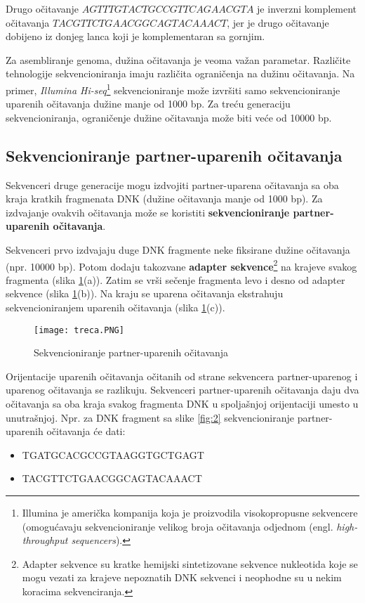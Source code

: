 \documentclass[12pt,oneside]{memoir}
\begin{document}
\noindent Drugo očitavanje $AGTTTGTACTGCCGTTCAGAACGTA$ je inverzni komplement očitavanja $TACGTTCTGAACGGCAGTACAAACT$, jer je drugo očitavanje dobijeno iz donjeg lanca koji je komplementaran sa gornjim.

Za asembliranje genoma, dužina očitavanja je veoma važan parametar. Različite tehnologije sekvencioniranja imaju različita ograničenja na dužinu očitavanja. Na primer, \textit{Illumina Hi-seq}\footnote{Illumina je američka kompanija koja je proizvodila visokopropusne sekvencere (omogućavaju sekvencioniranje velikog broja očitavanja odjednom  (engl. \textit{high-throughput sequencers}).} sekvencioniranje može izvršiti samo sekvencioniranje uparenih očitavanja dužine manje od 1000 bp. Za treću generaciju sekvencioniranja, ograničenje dužine očitavanja može biti veće od 10000 bp.


\subsection{Sekvencioniranje partner-uparenih očitavanja}

Sekvenceri druge generacije mogu izdvojiti partner-uparena očitavanja sa oba kraja kratkih fragmenata DNK (dužine očitavanja manje od 1000 bp). Za izdvajanje ovakvih očitavanja može se koristiti \textbf{sekvencioniranje partner-uparenih očitavanja}.

Sekvenceri prvo izdvajaju duge DNK fragmente neke fiksirane dužine očitavanja (npr. 10000 bp). Potom dodaju takozvane \textbf{adapter sekvence}\footnote{Adapter sekvence su kratke hemijski sintetizovane sekvence
nukleotida koje se mogu vezati za krajeve nepoznatih DNK sekvenci i neophodne
su u nekim koracima sekvenciranja.}
na krajeve svakog fragmenta (slika \ref{fig:3}(a)). Zatim se vrši sečenje fragmenta levo i desno od adapter sekvence (slika \ref{fig:3}(b)). Na kraju se uparena očitavanja ekstrahuju sekvencioniranjem uparenih očitavanja (slika \ref{fig:3}(c)).

\begin{figure}[!ht]
  \centering
  \texttt{[image: treca.PNG]}
  \caption{Sekvencioniranje partner-uparenih očitavanja \cite{WingKinSung}}
\label{fig:3}
\end{figure}

Orijentacije uparenih očitavanja očitanih od strane sekvencera partner-uparenog i uparenog očitavanja se razlikuju. Sekvenceri partner-uparenih očitavanja daju dva očitavanja sa oba kraja svakog fragmenta DNK u spoljašnjoj orijentaciji umesto u unutrašnjoj. Npr. za DNK fragment sa slike \ref{fig:2} sekvencioniranje partner-uparenih očitavanja će dati:
\begin{itemize}
\itemsep0em 
    \item {TGATGCACGCCGTAAGGTGCTGAGT}
    \item {TACGTTCTGAACGGCAGTACAAACT}
\end{itemize}
\end{document}
